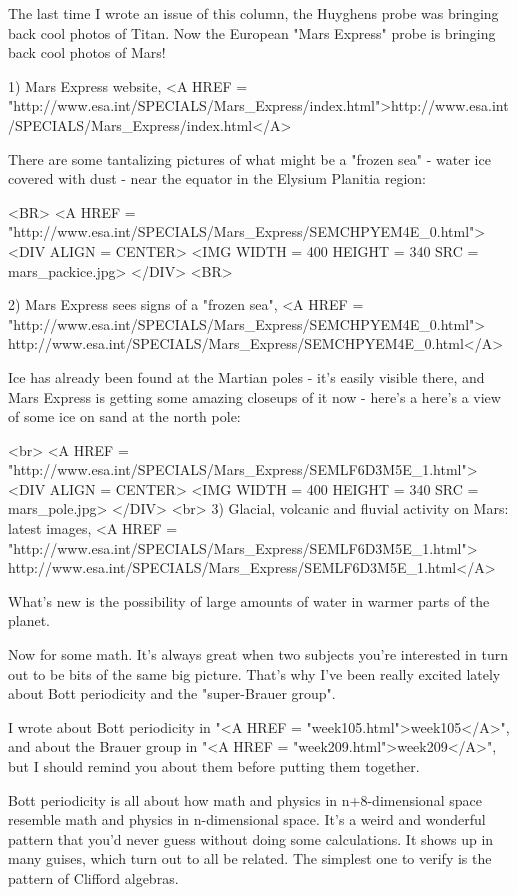 



The last time I wrote an issue of this column, the Huyghens probe was
bringing back cool photos of Titan.  Now the European "Mars Express"
probe is bringing back cool photos of Mars!  

1) Mars Express website, <A HREF = "http://www.esa.int/SPECIALS/Mars_Express/index.html">http://www.esa.int/SPECIALS/Mars_Express/index.html</A>

There are some tantalizing pictures of what might be a "frozen sea" - 
water ice covered with dust - near the equator in the Elysium Planitia region:

<BR>
<A HREF = "http://www.esa.int/SPECIALS/Mars_Express/SEMCHPYEM4E_0.html">
<DIV ALIGN = CENTER>
<IMG WIDTH = 400 HEIGHT = 340 SRC = mars_packice.jpg>
</DIV>
<BR>

2) Mars Express sees signs of a "frozen sea", 
<A HREF = "http://www.esa.int/SPECIALS/Mars_Express/SEMCHPYEM4E_0.html">
http://www.esa.int/SPECIALS/Mars_Express/SEMCHPYEM4E_0.html</A>

Ice has already been found at the Martian poles - it's easily visible there, 
and Mars Express is getting some amazing closeups of it now - here's a
here's a view of some ice on sand at the north pole:


<br>
<A HREF = "http://www.esa.int/SPECIALS/Mars_Express/SEMLF6D3M5E_1.html">
<DIV ALIGN = CENTER>
<IMG WIDTH = 400 HEIGHT = 340 SRC = mars_pole.jpg>
</DIV>
<br>
3) Glacial, volcanic and fluvial activity on Mars: latest images,
<A HREF = "http://www.esa.int/SPECIALS/Mars_Express/SEMLF6D3M5E_1.html">
http://www.esa.int/SPECIALS/Mars_Express/SEMLF6D3M5E_1.html</A>

What's new is the possibility of large amounts of water in warmer parts of 
the planet. 

Now for some math.  It's always great when two subjects you're interested in 
turn out to be bits of the same big picture.  That's why I've been really 
excited lately about Bott periodicity and the "super-Brauer group".  

I wrote about Bott periodicity in "<A HREF = "week105.html">week105</A>", and about the Brauer group
in "<A HREF = "week209.html">week209</A>", but I should remind you about them before putting them together.

Bott periodicity is all about how math and physics in n+8-dimensional space 
resemble math and physics in n-dimensional space.  It's a weird and wonderful
pattern that you'd never guess without doing some calculations.  It shows up
in many guises, which turn out to all be related.  The simplest one to verify 
is the pattern of Clifford algebras.

